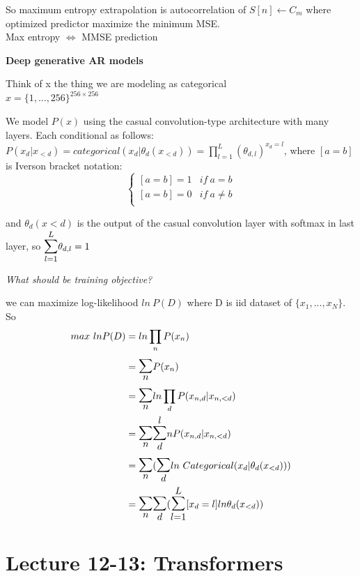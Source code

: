 \documentclass[12pt,a4paper]{article}
\begin{document}
So maximum entropy extrapolation is autocorrelation of $S[n]\leftarrow C_m$ where optimized predictor maximize the minimum MSE. \\
Max entropy $\Leftrightarrow$ MMSE prediction

\vspace{0.5cm}
\textbf{Deep generative AR models}

Think of x the thing we are modeling as categorical\\
$x=\{1, ..., 256\}^{256\times 256}$

We model $P(x)$ using the casual convolution-type architecture with many layers. Each conditional as follows:\\
$P(x_d|x_{<d})=categorical(x_d|\theta_d(x_{<d}))=\prod_{l=1}^L (\theta_{d,l})^{x_d=l}$, where $[a=b]$ is Iverson bracket notation:
\begin{equation*}
\begin{cases}
[a=b]=1 & if\ a=b\\
[a=b]=0 & if\ a\neq b\\
\end{cases}
\end{equation*}

and $\theta_d(x<d)$ is the output of the casual convolution layer with softmax in last layer, so $\bsum{l=1}{L}\theta_{d,l}=1$


\vspace{0.5cm}
\textit{What should be training objective?}

we can maximize log-likelihood $ln\ P(D)$ where D is iid dataset of $\{x_1,...,x_N\}$. So\\
\begin{equation*}
    \begin{split}
max\ lnP(D) &= ln\prod_nP(x_n)\\
&=\bsum{n}{} P(x_n)\\
&=\bsum{n}{} ln\prod_dP(x_{n,d}|x_{n,<d})\\
&=\bsum{n}{} \bsum{d} ln P(x_{n,d}|x_{n,<d})\\
&=\bsum{n}{} (\bsum{d}{} ln\ Categorical(x_d|\theta_d(x_{<d})))\\
&=\bsum{n}{}\bsum{d}{}(\bsum{l=1}{L}[x_d=l]ln\theta_d(x_{<d}))\\
    \end{split}
\end{equation*}

\section{Lecture 12-13: Transformers}
\end{document}
